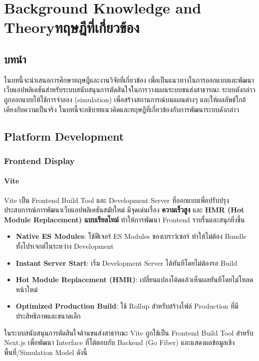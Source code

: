 \chapter{\ifenglish Background Knowledge and Theory\else ทฤษฎีที่เกี่ยวข้อง\fi}

\section{บทนำ}
  \sloppy\indent ในบทนี้จะนำเสนอการศึกษาทฤษฎีและงานวิจัยที่เกี่ยวข้อง เพื่อเป็นแนวทางในการออกแบบและพัฒนาเว็บแอปพลิเคชันสำหรับระบบสนับสนุนการตัดสินใจในการวางแผนระบบขนส่งสาธารณะ 
  ระบบดังกล่าวถูกออกแบบให้ใช้การจำลอง (simulation) เพื่อสร้างสถานการณ์บนแผนต่างๆ 
  และให้ผลลัพธ์ใกล้เคียงกับความเป็นจริง ในบทนี้จะอธิบายแนวคิดและทฤษฎีที่เกี่ยวข้องกับการพัฒนาระบบดังกล่าว

\section{Platform Development}

\subsection{Frontend Display}
\subsubsection{Vite}
\indent Vite เป็น Frontend Build Tool และ Development Server ที่ออกแบบเพื่อปรับปรุงประสบการณ์การพัฒนาเว็บแอปพลิเคชันสมัยใหม่ มีจุดเด่นเรื่อง \textbf{ความเร็วสูง} และ \textbf{HMR (Hot Module Replacement) แบบเรียลไทม์} ทำให้การพัฒนา Frontend ราบรื่นและสนุกยิ่งขึ้น  

\begin{itemize}
    \item \textbf{Native ES Modules}: ใช้ฟีเจอร์ ES Modules ของเบราว์เซอร์ ทำให้ไม่ต้อง Bundle ทั้งโปรเจกต์ในระหว่าง Development
    \item \textbf{Instant Server Start}: เริ่ม Development Server ได้ทันทีโดยไม่ต้องรอ Build
    \item \textbf{Hot Module Replacement (HMR)}: เปลี่ยนแปลงโค้ดแล้วเห็นผลทันทีโดยไม่โหลดหน้าใหม่
    \item \textbf{Optimized Production Build}: ใช้ Rollup สำหรับสร้างไฟล์ Production ที่มีประสิทธิภาพและขนาดเล็ก
\end{itemize}

ในระบบสนับสนุนการตัดสินใจด้านขนส่งสาธารณะ Vite ถูกใช้เป็น Frontend Build Tool สำหรับ Next.js เพื่อพัฒนา Interface ที่โต้ตอบกับ Backend (Go Fiber) 
และแสดงผลข้อมูลเชิงพื้นที่/Simulation Model ดังนี้

